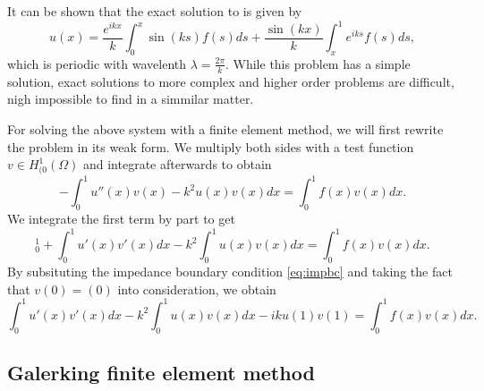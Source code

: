 \documentclass[a4paper]{article}
\newcommand{\HOzero}{\ensuremath{H^1_{(0}(\Omega)}}
\begin{document}
It can be shown that the exact solution to is given by
\begin{equation}
  u(x) = \frac{e^{ikx}}{k} \int^x_0 \sin(ks)f(s) ds
          + \frac{\sin(kx)}{k} \int^1_x e^{iks} f(s) ds,
\end{equation}
which is periodic with wavelenth $\lambda = \frac{2\pi}{k}$.
While this problem has a simple solution, exact solutions
to more complex and higher order problems are difficult,
nigh impossible to find in a simmilar matter.

For solving the above system with a finite element method,
we will first rewrite the problem in its weak form.
We multiply both sides with a test function $v \in \HOzero$
and integrate afterwards to obtain
\begin{equation}
  - \int^1_0 u''(x)v(x) - k^2u(x)v(x) dx = \int^1_0 f(x)v(x) dx.
\end{equation}
We integrate the first term by part to get
\begin{equation}
  [-u'(x)v(x)]^1_0 + \int^1_0 u'(x)v'(x)dx - k^2 \int^1_0 u(x)v(x) dx = \int^1_0 f(x)v(x) dx.
\end{equation}
By subsituting the impedance boundary condition \eqref{eq:impbc} and
taking the fact that $v(0) = (0)$ into consideration, we obtain
\begin{equation} \label{eq:weakprob}
  \int^1_0 u'(x)v'(x)dx - k^2 \int^1_0 u(x)v(x) dx - iku(1)v(1) = \int^1_0 f(x)v(x) dx.
\end{equation}

\subsection{Galerking finite element method}
\end{document}
